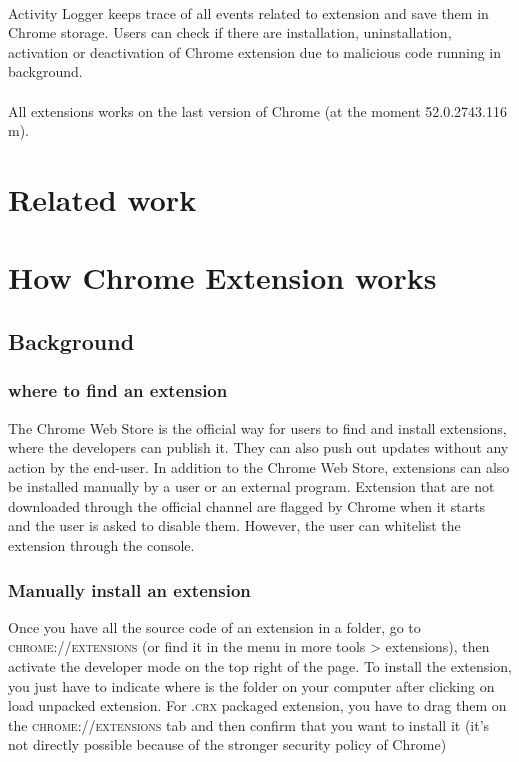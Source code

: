 \documentclass[12pt]{article}
\begin{document}
\begin{multicols}{2}
	\paragraph{}Activity Logger keeps trace of all events related to extension and save them in Chrome storage. Users can check if there are installation, uninstallation, activation or deactivation of Chrome extension due to malicious code running in background.
	\paragraph{}All extensions works on the last version of Chrome (at the moment 52.0.2743.116 m).
	\section{Related work}
\section*{How Chrome Extension works}
\subsection*{Background}
\subsubsection*{where to find an extension}
The Chrome Web Store is the official way for users
to find and install extensions, where the developers can publish it. They can also push out updates without any action
by the end-user.
In addition to the Chrome Web Store, extensions can
also be installed manually by a user or an external program.
Extension that are not downloaded through the official channel are flagged by Chrome when it starts	and the user is asked to disable them.
However, the user can whitelist the extension through the console.
\subsubsection*{Manually install an extension}
	Once you have all the source code of an extension in a folder, go to  \textsc{chrome://extensions} (or find it in the menu in more tools > extensions), then activate the developer mode on the top right of the page. To install the extension, you just have to indicate where is the folder on your computer after clicking on load unpacked extension. For \textsc{.crx} packaged extension, you have to drag them on the \textsc{chrome://extensions} tab and then confirm that you want to install it (it's not directly possible because of the stronger security policy of Chrome)

\end{multicols}
\end{document}
